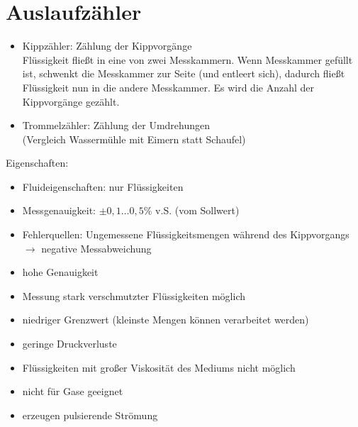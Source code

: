 \documentclass{scrreprt}
\begin{document}
\section{Auslaufzähler}
\begin{itemize}
\item Kippzähler: Zählung der Kippvorgänge\\
Flüssigkeit fließt in eine von zwei Messkammern. Wenn Messkammer gefüllt ist, schwenkt die Messkammer zur Seite (und entleert sich), dadurch fließt Flüssigkeit nun in die andere Messkammer. Es wird die Anzahl der Kippvorgänge gezählt.
\item Trommelzähler: Zählung der Umdrehungen\\
(Vergleich Wassermühle mit Eimern statt Schaufel)
\end{itemize}
Eigenschaften:
\begin{itemize}
\item Fluideigenschaften: nur Flüssigkeiten
\item Messgenauigkeit: $\pm 0,1 \ldots 0,5 \%$ v.S. (vom Sollwert)
\item Fehlerquellen: Ungemessene Flüssigkeitsmengen während des Kippvorgangs\\
$\to$ negative Messabweichung
\end{itemize}
\begin{itemize}[label=$+$]
\item hohe Genauigkeit
\item Messung stark verschmutzter Flüssigkeiten möglich
\item niedriger Grenzwert (kleinste Mengen können verarbeitet werden)
\item geringe Druckverluste
\end{itemize}
\begin{itemize}[label=$-$]
\item Flüssigkeiten mit großer Viskosität des Mediums nicht möglich
\item nicht für Gase geeignet
\item erzeugen pulsierende Strömung
\end{itemize}
\end{document}

